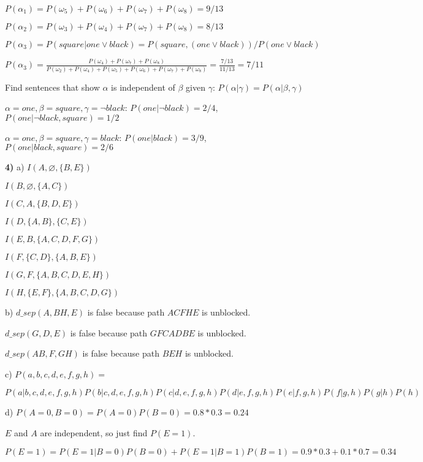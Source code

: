 \documentclass[11pt, oneside]{article}   	%
\begin{document}
$P(\alpha_1) = P(\omega_5) + P(\omega_6) + P(\omega_7) + P(\omega_8) = 9/13$

$P(\alpha_2) = P(\omega_3) + P(\omega_4) + P(\omega_7) + P(\omega_8) = 8/13$

$P(\alpha_3) = P(square | one \lor black) = P(square, (one \lor black)) / P(one \lor black)$

$P(\alpha_3) = \frac{P(\omega_4) + P(\omega_7) + P(\omega_8)}{P(\omega_2) + P(\omega_4) + P(\omega_5) + P(\omega_6) + P(\omega_7) + P(\omega_8)} = \frac{7/13}{11/13} = 7/11$

Find sentences that show $\alpha$ is independent of $\beta$ given $\gamma$: $P(\alpha | \gamma) = P(\alpha | \beta, \gamma)$

$\alpha = one, \beta = square, \gamma = \lnot black$: $P(one | \lnot black) = 2/4$, $P(one | \lnot black, square) = 1/2$

$\alpha = one, \beta = square, \gamma = black$: $P(one | black) = 3/9$, $P(one | black, square) = 2/6$

\textbf{4)} a) $I(A, \varnothing, \{B, E\})$

$I(B, \varnothing, \{A, C\})$

$I(C, A, \{B, D, E\})$

$I(D, \{A, B\}, \{C, E\})$

$I(E, B, \{A,C,D,F,G\})$

$I(F, \{C,D\}, \{A, B, E\})$

$I(G, F, \{A,B,C,D,E,H\})$

$I(H, \{E, F\}, \{A,B,C,D,G\})$

b) $d\_sep(A, BH, E)$ is false because path $ACFHE$ is unblocked.

$d\_sep(G,D,E)$ is false because path $GFCADBE$ is unblocked.

$d\_sep(AB, F, GH)$ is false because path $BEH$ is unblocked.

c) $P(a,b,c,d,e,f,g,h) = $ 

$P(a|b,c,d,e,f,g,h)P(b|c,d,e,f,g,h)P(c|d,e,f,g,h)P(d|e,f,g,h)P(e|f,g,h)P(f|g,h)P(g|h)P(h)$

d) $P(A = 0, B = 0) = P(A = 0)P(B=0) = 0.8 * 0.3 = 0.24$

$E$ and $A$ are independent, so just find $P(E = 1)$. 

$P(E=1) = P(E=1|B=0)P(B=0) + P(E=1|B=1)P(B=1) = 0.9*0.3 + 0.1 * 0.7 = 0.34$
\end{document}
